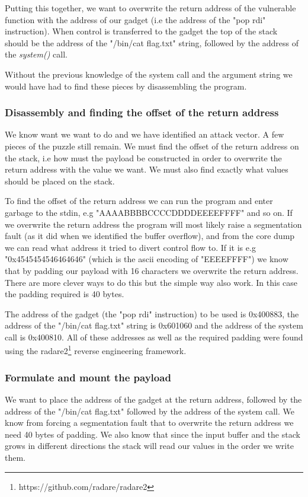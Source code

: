 \begin{enumerate}
Putting this together, we want to overwrite the return address of the vulnerable function
with the address of our gadget (i.e the address of the "pop rdi" instruction). When control
is transferred to the gadget the top of the stack should be the address of the "/bin/cat flag.txt"
string, followed by the address of the \textit{system()} call.

Without the previous knowledge of the system call and the argument string we would have had
to find these pieces by disassembling the program.

\subsubsection{Disassembly and finding the offset of the return address}

We know want we want to do and we have identified an attack vector. A few pieces of the
puzzle still remain. We must find the offset of the return address on the stack, i.e how
must the payload be constructed in order to overwrite the return address with the value we
want. We must also find exactly what values should be placed on the stack.

To find the offset of the return address we can run the program and enter garbage to the
stdin, e.g "AAAABBBBCCCCDDDDEEEEFFFF" and so on. If we overwrite the return address the
program will most likely raise a segmentation fault (as it did when we identified the
buffer overflow), and from the core dump we can read what address it tried to divert
control flow to. If it is e.g "0x4545454546464646" (which is the ascii encoding of
"EEEEFFFF") we know that by padding our payload with 16 characters we overwrite the return
address. There are more clever ways to do this but the simple way also work. In this case
the padding required is 40 bytes.

The address of the gadget (the "pop rdi" instruction) to be used is 0x400883, the address
of the "/bin/cat flag.txt" string is 0x601060 and the address of the system call is
0x400810. All of these addresses as well as the required padding were found using the
radare2\footnote{https://github.com/radare/radare2} reverse engineering framework.

\subsubsection{Formulate and mount the payload}

We want to place the address of the gadget at the return address, followed by the address
of the "/bin/cat flag.txt" followed by the address of the system call. We know from
forcing a segmentation fault that to overwrite the return address we need 40 bytes of
padding. We also know that since the input buffer and the stack grows in different
directions the stack will read our values in the order we write them.


\end{enumerate}
